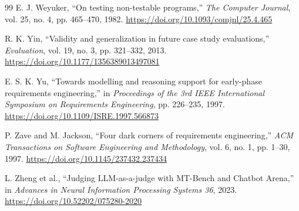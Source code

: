 \documentclass[10pt,a4paper]{article}
\begin{document}
\begin{thebibliography}{99}
E. J. Weyuker, ``On testing non-testable programs,'' \emph{The Computer Journal}, vol. 25, no. 4, pp. 465--470, 1982. \url{https://doi.org/10.1093/comjnl/25.4.465}

R. K. Yin, ``Validity and generalization in future case study evaluations,'' \emph{Evaluation}, vol. 19, no. 3, pp. 321--332, 2013. \url{https://doi.org/10.1177/1356389013497081}

E. S. K. Yu, ``Towards modelling and reasoning support for early-phase requirements engineering,'' in \emph{Proceedings of the 3rd IEEE International Symposium on Requirements Engineering}, pp. 226--235, 1997. \url{https://doi.org/10.1109/ISRE.1997.566873}

P. Zave and M. Jackson, ``Four dark corners of requirements engineering,'' \emph{ACM Transactions on Software Engineering and Methodology}, vol. 6, no. 1, pp. 1--30, 1997. \url{https://doi.org/10.1145/237432.237434}

L. Zheng et al., ``Judging LLM-as-a-judge with MT-Bench and Chatbot Arena,'' in \emph{Advances in Neural Information Processing Systems 36}, 2023. \url{https://doi.org/10.52202/075280-2020}

\end{thebibliography}
\end{document}
